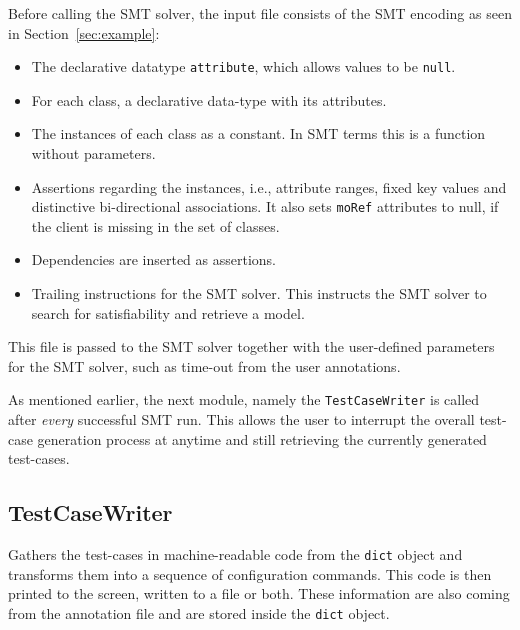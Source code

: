 Before calling the SMT solver, the input file consists of the SMT encoding as seen in Section~\ref{sec:example}:
\begin{itemize}
 \item The declarative datatype \texttt{attribute}, which allows values to be \texttt{null}.
 
 \item For each class, a declarative data-type with its attributes.
 
 \item The instances of each class as a constant. In SMT terms this is a function without parameters. 
 
 \item Assertions regarding the instances, i.e., attribute ranges, fixed key values and distinctive bi-directional associations. It also sets \texttt{moRef} attributes to null, if the client is missing in the set of classes.
 
 \item Dependencies are inserted as assertions.
 
 \item Trailing instructions for the SMT solver. This instructs the SMT solver to search for satisfiability and retrieve a model. 
\end{itemize}

This file is passed to the SMT solver together with the user-defined parameters for the SMT solver, such as time-out from the user annotations.

As mentioned earlier, the next module, namely the \texttt{TestCaseWriter} is called after \emph{every} successful SMT run. This allows the user to interrupt the overall test-case generation process at anytime and still retrieving the currently generated test-cases.


\subsection*{TestCaseWriter}

Gathers the test-cases in machine-readable code from the \verb|dict| object and transforms them into a sequence of configuration commands. This code is then printed to the screen, written to a file or both. These information are also coming from the annotation file and are stored inside the \verb|dict| object. 